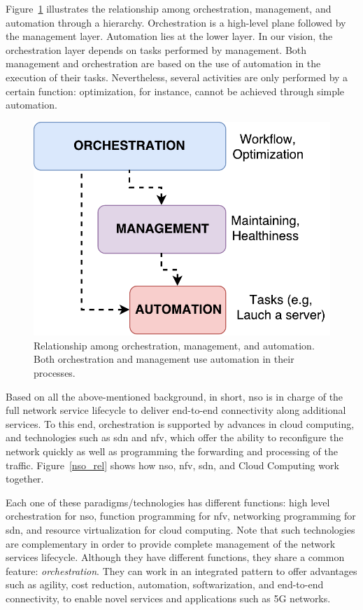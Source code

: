 Figure~\ref{diff} illustrates the relationship among orchestration, management, and automation through a hierarchy. Orchestration is a high-level plane followed by  the management layer. Automation lies at the lower layer. In our vision, the orchestration layer depends on tasks performed by management. Both management and orchestration are based on the use of automation in the execution of their tasks. Nevertheless, several activities are only performed by a certain function: optimization, for instance, cannot be achieved through simple automation. 

\begin{figure}[t]
    \centering
    \includegraphics[scale=.45]{Figures/02_Background/fig7.pdf}
      \caption{Relationship among orchestration, management, and automation. Both orchestration and management use automation in their processes.}
      \label{diff}
\end{figure}

Based on all the above-mentioned background, in short, \gls{nso} is in charge of the full network service lifecycle to deliver end-to-end connectivity along additional services. To this end, orchestration is supported by advances in cloud computing, and technologies such as \gls{sdn} and \gls{nfv}, which offer the ability to reconfigure the network quickly as well as programming the forwarding and processing of the traffic. Figure~\ref{nso_rel} shows how \gls{nso}, \gls{nfv}, \gls{sdn}, and Cloud Computing work together.

Each one of these paradigms/technologies has different functions: high level orchestration for \gls{nso}, function programming for \gls{nfv}, networking programming for \gls{sdn},  and resource virtualization for cloud computing. Note that such technologies are complementary in order to provide complete management of the network services lifecycle. Although they have different functions, they share a common feature: \textit{orchestration}. They can work in an integrated pattern to offer advantages such as agility, cost reduction, automation, softwarization, and end-to-end connectivity, to enable novel services and applications such as 5G networks.

